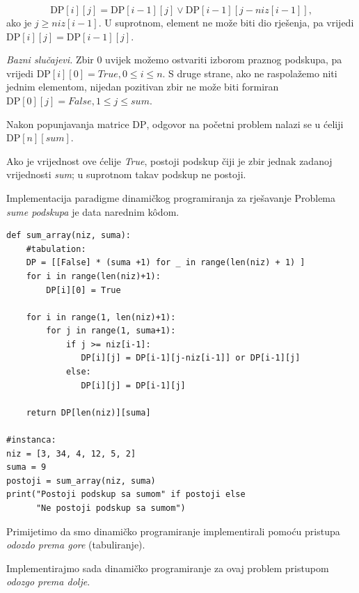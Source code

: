\begin{solution}
	$$
	\textrm{DP}[i][j]=
	\textrm{DP}[i-1][j] \vee \textrm{DP}[i-1][j-niz[i-1]],$$
	ako je $j \geq niz[i-1].$	U suprotnom, element ne može biti dio rješenja, pa vrijedi $\textrm{DP}[i][j] =	\textrm{DP}[i-1][j].$
	
	\medskip
	
	\textit{Bazni slučajevi.}  	Zbir $0$ uvijek možemo ostvariti izborom praznog podskupa, pa vrijedi $
	\textrm{DP}[i][0]=True, 
	0\leq i\leq n.$ 	S druge strane, ako ne raspolažemo niti jednim elementom, nijedan pozitivan zbir ne može biti formiran $ \textrm{DP}[0][j]=False, 1\leq j\leq sum.
	$
	
	\medskip
	
	Nakon popunjavanja matrice $\textrm{DP}$, odgovor na početni problem nalazi se u ćeliji $\textrm{DP}[n][sum].$
	
	Ako je vrijednost ove ćelije \textit{True}, postoji podskup čiji je zbir jednak zadanoj vrijednosti \textit{sum}; u suprotnom takav podskup ne postoji.
	
\end{solution}

   
    Implementacija paradigme dinamičkog programiranja za rješavanje Pro\-blema \emph{sume podskupa} je data narednim k\^odom. 
   
   \begin{verbatim}
def sum_array(niz, suma):
    #tabulation:
    DP = [[False] * (suma +1) for _ in range(len(niz) + 1) ]
    for i in range(len(niz)+1):
        DP[i][0] = True

    for i in range(1, len(niz)+1):   
        for j in range(1, suma+1):
            if j >= niz[i-1]:
               DP[i][j] = DP[i-1][j-niz[i-1]] or DP[i-1][j]
            else:
               DP[i][j] = DP[i-1][j]

    return DP[len(niz)][suma]

#instanca:
niz = [3, 34, 4, 12, 5, 2]
suma = 9
postoji = sum_array(niz, suma)
print("Postoji podskup sa sumom" if postoji else  
      "Ne postoji podskup sa sumom")
\end{verbatim}

Primijetimo da smo dinamičko programiranje implementirali pomoću pristupa \textit{odozdo prema gore} (tabuliranje). 

Implementirajmo sada dinamičko programiranje za ovaj problem pristupom \textit{odozgo prema dolje}.

